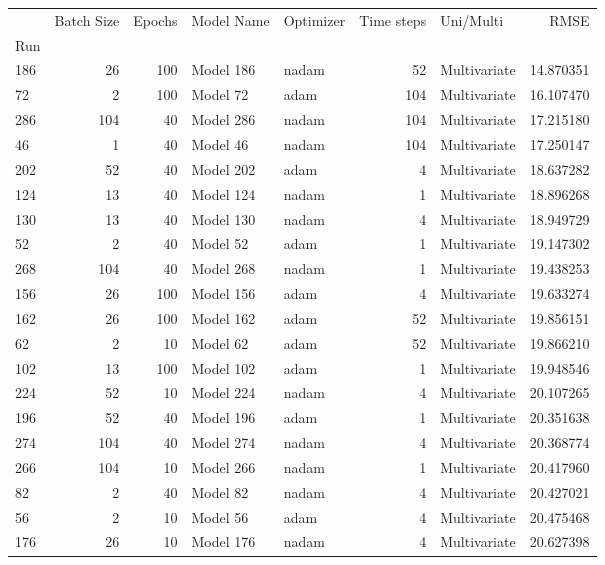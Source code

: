 \begin{tabular}{lrrllrlr}
\toprule
 & Batch Size & Epochs & Model Name & Optimizer & Time steps & Uni/Multi & RMSE \\
Run &  &  &  &  &  &  &  \\
\midrule
186 & 26 & 100 & Model 186 & nadam & 52 & Multivariate & 14.870351 \\
72 & 2 & 100 & Model 72 & adam & 104 & Multivariate & 16.107470 \\
286 & 104 & 40 & Model 286 & nadam & 104 & Multivariate & 17.215180 \\
46 & 1 & 40 & Model 46 & nadam & 104 & Multivariate & 17.250147 \\
202 & 52 & 40 & Model 202 & adam & 4 & Multivariate & 18.637282 \\
124 & 13 & 40 & Model 124 & nadam & 1 & Multivariate & 18.896268 \\
130 & 13 & 40 & Model 130 & nadam & 4 & Multivariate & 18.949729 \\
52 & 2 & 40 & Model 52 & adam & 1 & Multivariate & 19.147302 \\
268 & 104 & 40 & Model 268 & nadam & 1 & Multivariate & 19.438253 \\
156 & 26 & 100 & Model 156 & adam & 4 & Multivariate & 19.633274 \\
162 & 26 & 100 & Model 162 & adam & 52 & Multivariate & 19.856151 \\
62 & 2 & 10 & Model 62 & adam & 52 & Multivariate & 19.866210 \\
102 & 13 & 100 & Model 102 & adam & 1 & Multivariate & 19.948546 \\
224 & 52 & 10 & Model 224 & nadam & 4 & Multivariate & 20.107265 \\
196 & 52 & 40 & Model 196 & adam & 1 & Multivariate & 20.351638 \\
274 & 104 & 40 & Model 274 & nadam & 4 & Multivariate & 20.368774 \\
266 & 104 & 10 & Model 266 & nadam & 1 & Multivariate & 20.417960 \\
82 & 2 & 40 & Model 82 & nadam & 4 & Multivariate & 20.427021 \\
56 & 2 & 10 & Model 56 & adam & 4 & Multivariate & 20.475468 \\
176 & 26 & 10 & Model 176 & nadam & 4 & Multivariate & 20.627398 \\
\bottomrule
\end{tabular}
